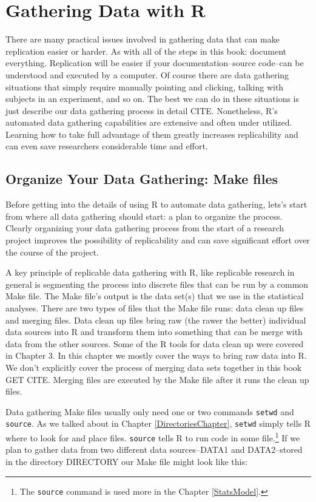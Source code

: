 \documentclass[ChapterTOCs,krantz1]{krantz}\usepackage{graphicx, color}
\begin{document}
\chapter{Gathering Data with R}\label{DataGather}

There are many practical issues involved in gathering data that can make replication easier or harder. As with all of the steps in this book: document everything. Replication will be easier if your documentation--source code--can be understood and executed by a computer. Of course there are data gathering situations that simply require manually pointing and clicking, talking with subjects in an experiment, and so on. The best we can do in these situations is just describe our data gathering process in detail CITE. Nonetheless, R's automated data gathering capabilities are extensive and often under utilized. Learning how to take full advantage of them greatly increases replicability and can even save researchers considerable time and effort.

\section{Organize Your Data Gathering: Make files}

Before getting into the details of using R to automate data gathering, lets's start from where all data gathering should start: a plan to organize the process. Clearly organizing your data gathering process from the start of a research project improves the possibility of replicability and can save significant effort over the course of the project. 

A key principle of replicable data gathering with R, like replicable research in general is segmenting the process into discrete files that can be run by a common Make file. The Make file's output is the data set(s) that we use in the statistical analyses. There are two types of files that the Make file runs: data clean up files and merging files. Data clean up files bring raw (the rawer the better) individual data sources into R and transform them into something that can be merge with data from the other sources. Some of the R tools for data clean up were covered in Chapter 3. In this chapter we mostly cover the ways to bring raw data into R. We don't explicitly cover the process of merging data sets together in this book GET CITE. Merging files are executed by the Make file after it runs the clean up files.

Data gathering Make files usually only need one or two commands {\tt{setwd}} and {\tt{source}}. As we talked about in Chapter \ref{DirectoriesChapter}, {\tt{setwd}} simply tells R where to look for and place files. {\tt{source}} tells R to run code in some file.\footnote{The {\tt{source}} command is used more in the Chapter \ref{StatsModel}.}  If we plan to gather data from two different data sources--DATA1 and DATA2--stored in the directory DIRECTORY our Make file might look like this:
\end{document}

